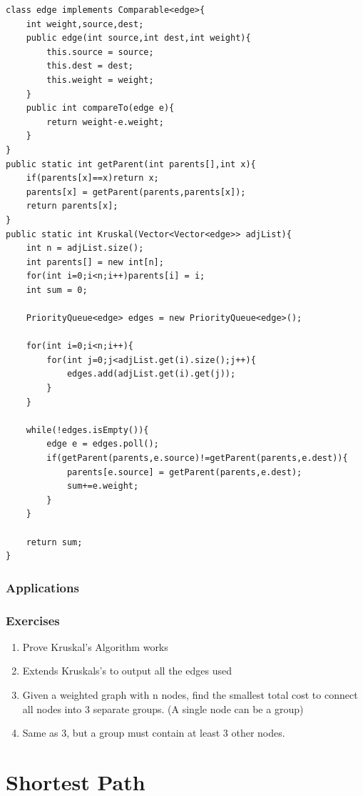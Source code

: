 \documentclass[11pt,oneside]{book}
\begin{document}
\begin{lstlisting}
class edge implements Comparable<edge>{
    int weight,source,dest;
    public edge(int source,int dest,int weight){
        this.source = source;
        this.dest = dest;
        this.weight = weight;
    }
    public int compareTo(edge e){
        return weight-e.weight;
    }
}
public static int getParent(int parents[],int x){
    if(parents[x]==x)return x;
    parents[x] = getParent(parents,parents[x]);
    return parents[x];
}
public static int Kruskal(Vector<Vector<edge>> adjList){
    int n = adjList.size();
    int parents[] = new int[n];
    for(int i=0;i<n;i++)parents[i] = i;
    int sum = 0;
    
    PriorityQueue<edge> edges = new PriorityQueue<edge>();
    
    for(int i=0;i<n;i++){
        for(int j=0;j<adjList.get(i).size();j++){
            edges.add(adjList.get(i).get(j));
        }
    }
    
    while(!edges.isEmpty()){
        edge e = edges.poll();
        if(getParent(parents,e.source)!=getParent(parents,e.dest)){
            parents[e.source] = getParent(parents,e.dest);
            sum+=e.weight;
        }
    }
    
    return sum;
}
\end{lstlisting}

\subsection{Applications}

\subsection{Exercises}

\begin{enumerate}
\item Prove Kruskal's Algorithm works
\item Extends Kruskals's to output all the edges used
\item Given a weighted graph with n nodes, find the smallest total cost to connect all nodes into 3 separate groups. (A single node can be a group)
\item Same as 3, but a group must contain at least 3 other nodes.
\end{enumerate}

    \chapter{ Shortest Path }
        
\end{document}
